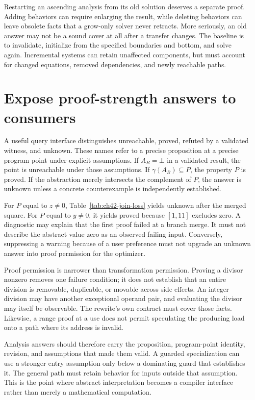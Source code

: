Restarting an ascending analysis from its old solution deserves a separate proof.
Adding behaviors can require enlarging the result, while deleting behaviors can leave obsolete facts that a grow-only solver never retracts.
More seriously, an old answer may not be a sound cover at all after a transfer changes.
The baseline is to invalidate, initialize from the specified boundaries and bottom, and solve again.
Incremental systems can retain unaffected components, but must account for changed equations, removed dependencies, and newly reachable paths.

\section{Expose proof-strength answers to consumers}
\label{sec:ch42-query-contract}

A useful query interface distinguishes unreachable, proved, refuted by a validated witness, and unknown.
These names refer to a precise proposition at a precise program point under explicit assumptions.
If $A_B=\bot$ in a validated result, the point is unreachable under those assumptions.
If $\gamma(A_B)\subseteq P$, the property $P$ is proved.
If the abstraction merely intersects the complement of $P$, the answer is unknown unless a concrete counterexample is independently established.

For $P$ equal to $z\neq0$, Table~\ref{tab:ch42-join-loss} yields unknown after the merged square.
For $P$ equal to $y\neq0$, it yields proved because $[1,11]$ excludes zero.
A diagnostic may explain that the first proof failed at a branch merge.
It must not describe the abstract value zero as an observed failing input.
Conversely, suppressing a warning because of a user preference must not upgrade an unknown answer into proof permission for the optimizer.

Proof permission is narrower than transformation permission.
Proving a divisor nonzero removes one failure condition; it does not establish that an entire division is removable, duplicable, or movable across side effects.
An integer division may have another exceptional operand pair, and evaluating the divisor may itself be observable.
The rewrite's own contract must cover those facts.
Likewise, a range proof at a use does not permit speculating the producing load onto a path where its address is invalid.

Analysis answers should therefore carry the proposition, program-point identity, revision, and assumptions that made them valid.
A guarded specialization can use a stronger entry assumption only below a dominating guard that establishes it.
The general path must retain behavior for inputs outside that assumption.
This is the point where abstract interpretation becomes a compiler interface rather than merely a mathematical computation.

